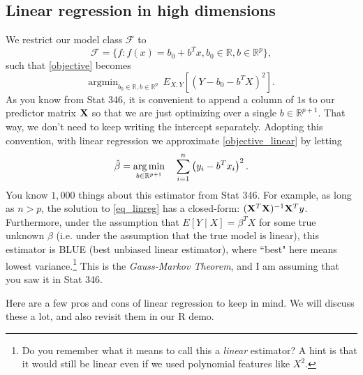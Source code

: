 \subsection{Linear regression in high dimensions}

We restrict our model class $\mathcal{F}$ to
$$
\mathcal{F} = \{ f : f(x) = b_0 + b^T x, b_0 \in \mathbb{R}, b \in \mathbb{R}^p\},
$$
such that \eqref{objective} becomes
\begin{equation}
\label{objective_linear}
\mathrm{argmin}_{b_0 \in \mathbb{R}, b \in \mathbb{R}^p} \ \ E_{X,Y} \left[ \left(Y - b_0 - b^T X \right)^2 \right].
\end{equation}
As you know from Stat 346, it is convenient to append a column of $1$s to our predictor matrix $\bold{X}$ so that we are just optimizing over a single $b \in \mathbb{R}^{p+1}$. That way, we don't need to keep writing the intercept separately. Adopting this convention, with linear regression we approximate \eqref{objective_linear} by letting
\begin{equation}
\label{eq_linreg}
\hat{\beta} = \mathop{\mathrm{arg\,min}}_{b \in \mathbb{R}^{p+1}}  \ \ \ \sum_{i=1}^n \left(y_i - b^T x_i \right)^2. 
\end{equation}
You know $1,000$ things about this estimator from Stat 346. For example, as long as $n > p$, the solution to \eqref{eq_linreg} has a closed-form: $(\bold{X}^T\bold{X})^{-1} \bold{X}^T y$. Furthermore, under the assumption that $E[Y \mid X] = \beta^T X$ for some true unknown $\beta$ (i.e. under the assumption that the true model is linear), this estimator is BLUE (best unbiased linear estimator), where ``best" here means lowest variance.\footnote{Do you remember what it means to call this a \emph{linear} estimator? A hint is that it would still be linear even if we used polynomial features like $X^2$.} This is the \emph{Gauss-Markov Theorem}, and I am assuming that you saw it in Stat 346. 

Here are a few pros and cons of linear regression to keep in mind. We will discuss these  a lot, and also revisit them in our R demo.

